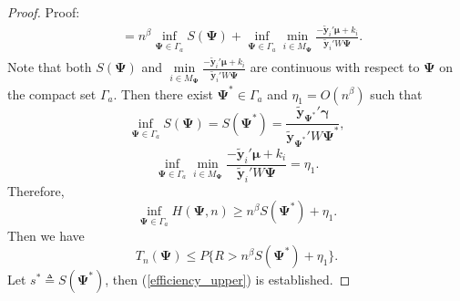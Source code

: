 \documentclass[final,11pt,3p]{article}\usepackage{setspace}
\begin{document}
\begin{proof}{Proof:}
\begin{align*}
& = n^{\beta} \inf_{\boldsymbol{\Psi} \in \Gamma_a} S(\boldsymbol{\Psi}) + \inf_{\boldsymbol{\Psi} \in \Gamma_a} \min_{i \in M_{\boldsymbol{\Psi}}} \frac{-  \tilde{\boldsymbol{y}}_i'\boldsymbol{\mu}  + k_i}{ \tilde{\boldsymbol{y}}_i' W \boldsymbol{\Psi}}.
\end{align*}
Note that both $S(\boldsymbol{\Psi})$ and $\min \limits_{i \in M_{\boldsymbol{\Psi}}} \frac{-  \tilde{\boldsymbol{y}}_i'\boldsymbol{\mu} + k_i}{ \tilde{\boldsymbol{y}}_i' W \boldsymbol{\Psi}}$ are continuous with respect to $\boldsymbol{\Psi}$ on the compact set $\Gamma_a$. Then there exist $\boldsymbol{\Psi}^* \in \Gamma_a$ and $\eta_1 = O(n^{\beta})$ such that
\begin{equation*}
\inf_{\boldsymbol{\Psi} \in \Gamma_a} S(\boldsymbol{\Psi})  = S(\boldsymbol{\Psi}^*)= \frac{ \tilde{\boldsymbol{y}}_{\boldsymbol{\Psi}^*}'\boldsymbol{\gamma} }{\tilde{\boldsymbol{y}}_{\boldsymbol{\Psi}^*}' W \boldsymbol{\Psi}^*},
\end{equation*}
\begin{equation}\label{inter_step2}
\inf_{\boldsymbol{\Psi} \in \Gamma_a}\min \limits_{i \in M_{\boldsymbol{\Psi}}} \frac{-  \tilde{\boldsymbol{y}}_i'\boldsymbol{\mu}  + k_i}{ \tilde{\boldsymbol{y}}_i' W \boldsymbol{\Psi}} = \eta_1.
\end{equation}
Therefore,
\begin{equation*}
\inf_{\boldsymbol{\Psi} \in \Gamma_a}  H(\boldsymbol{\Psi}, n) \ge n^{\beta} S(\boldsymbol{\Psi}^*) + \eta_1.
\end{equation*}
Then we have
\begin{equation*}
T_n(\boldsymbol{\Psi}) \le {P}\{ R >  n^{\beta} S(\boldsymbol{\Psi}^*) + \eta_1 \}.
\end{equation*}
Let $s^* \triangleq S(\boldsymbol{\Psi}^*)$, then (\ref{efficiency_upper}) is established.


\end{proof}
\end{document}
